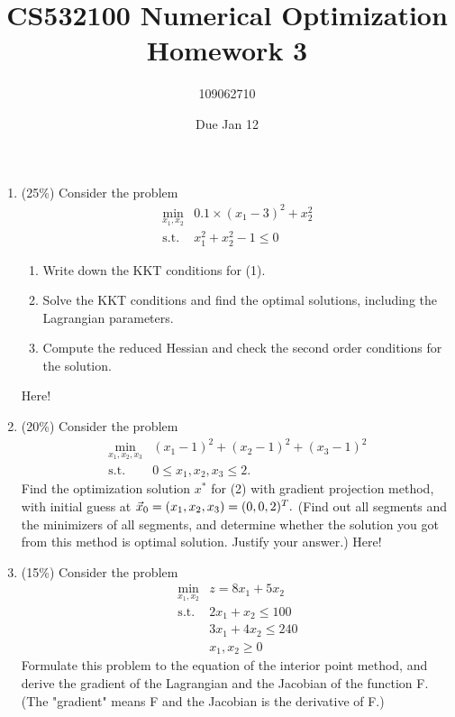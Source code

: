 \documentclass[a4paper,10pt]{article}
\title{CS532100 Numerical Optimization Homework 3}
\author{109062710}
\date{Due Jan 12}
\begin{document}
\maketitle
\begin{enumerate}
    \item (25\%)
    Consider the problem
    \begin{equation}\label{(1)}
        \begin{array}{cc}
            \displaystyle\min_{x_1,x_2} & 0.1\times(x_1-3)^2+x_2^2 \\
            \mbox{s.t.} & x_1^2+x_2^2 -1 \le 0
        \end{array}
    \end{equation}
\begin{enumerate}
    
\item Write down the KKT conditions for (1).
\item Solve the KKT conditions and find the optimal solutions, including the Lagrangian parameters.
\item Compute the reduced Hessian and check the second order conditions for the solution.
\end{enumerate}
{\color{blue}
Here!
}

    \item (20\%) Consider the problem 
    \begin{equation}\label{(2)}
        \begin{array}{cc}
            \displaystyle\min_{x_1,x_2, x_3} & (x_1-1)^2+(x_2 - 1)^2 + (x_3 - 1)^2 \\
            \mbox{s.t.} & 0\le x_1, x_2, x_3\le 2.
        \end{array}
    \end{equation}
    Find the optimization solution $x^{\ast}$ for (2) with gradient projection method, with initial guess at $\vec{x}_0 =  (x_1, x_2, x_3) = (0, 0, 2)^T.\\$
    (Find out all segments and the minimizers of all segments, and determine whether the
solution you got from this method is optimal solution. Justify your answer.)
{\color{blue}
Here!
}


\item (15\%) Consider the problem 
\begin{equation}\label{(3)}
    \begin{array}{cc}
        \displaystyle\min_{x_1,x_2} & z = 8x_1 + 5x_2 \\
        \mbox{s.t.} & 2x_1 + x_2 \le 100  \\
        & 3x_1 + 4x_2 \le 240   \\
        & x_1, x_2 \ge 0
    \end{array}
\end{equation}
Formulate this problem to the equation of the interior point method, and
derive the gradient of the Lagrangian and the Jacobian of the function F.
(The "gradient" means F and the Jacobian is the derivative of F.)


\end{enumerate}
\end{document}
